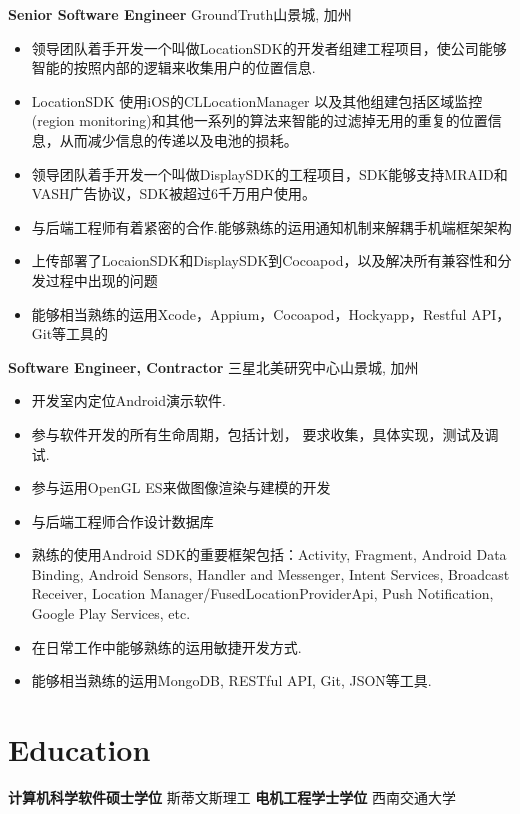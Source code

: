 \documentclass[10pt,letterpaper,sans]{moderncv}        %
\begin{document}
\begin{CJK*}{UTF8}{gbsn}
\vspace*{0.5cm}
{\textbf{Senior Software Engineer}}
{GroundTruth}{山景城, 加州}{}{
\begin{itemize}
    \item 领导团队着手开发一个叫做LocationSDK的开发者组建工程项目，使公司能够智能的按照内部的逻辑来收集用户的位置信息.
    \item LocationSDK 使用iOS的CLLocationManager 以及其他组建包括区域监控(region monitoring)和其他一系列的算法来智能的过滤掉无用的重复的位置信息，从而减少信息的传递以及电池的损耗。
    \item 领导团队着手开发一个叫做DisplaySDK的工程项目，SDK能够支持MRAID和VASH广告协议，SDK被超过6千万用户使用。
    \item 与后端工程师有着紧密的合作.能够熟练的运用通知机制来解耦手机端框架架构
    \item 上传部署了LocaionSDK和DisplaySDK到Cocoapod，以及解决所有兼容性和分发过程中出现的问题
    \item 能够相当熟练的运用Xcode，Appium，Cocoapod，Hockyapp，Restful API，Git等工具的
\end{itemize}} 


\vspace*{0.5cm}
{\textbf{Software Engineer, Contractor}}
{三星北美研究中心}{山景城, 加州}{}{
\begin{itemize}
    \item 开发室内定位Android演示软件.
    \item 参与软件开发的所有生命周期，包括计划， 要求收集，具体实现，测试及调试.
    \item 参与运用OpenGL ES来做图像渲染与建模的开发
    \item 与后端工程师合作设计数据库
    \item 熟练的使用Android SDK的重要框架包括：Activity, Fragment, Android Data Binding, Android Sensors, Handler and Messenger, Intent Services, Broadcast Receiver, Location Manager/FusedLocationProviderApi, Push Notification, Google Play Services, etc.
    \item 在日常工作中能够熟练的运用敏捷开发方式.
    \item 能够相当熟练的运用MongoDB, RESTful API, Git, JSON等工具.
\end{itemize}} 

\section{Education}
{\textbf{计算机科学软件硕士学位}}
{斯蒂文斯理工}{}{}{}  %
{\textbf{电机工程学士学位}}
{西南交通大学}{}{}{}

\end{CJK*}
\end{document}

